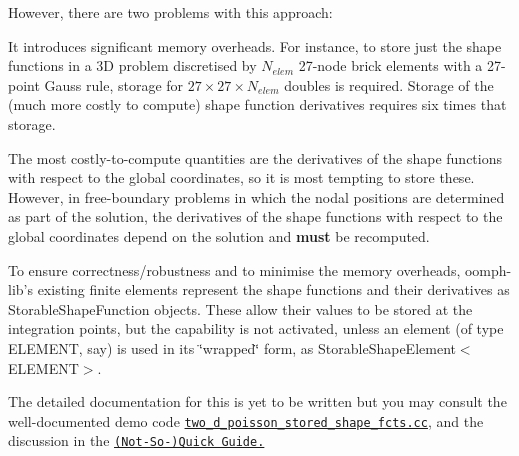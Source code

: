 However, there are two problems with this approach\-:
\begin{DoxyEnumerate}
\item It introduces significant memory overheads. For instance, to store just the shape functions in a 3\-D problem discretised by $ N_{elem}$ 27-\/node brick elements with a 27-\/point Gauss rule, storage for $ 27 \times 27 \times N_{elem} $ doubles is required. Storage of the (much more costly to compute) shape function derivatives requires six times that storage.
\item The most costly-\/to-\/compute quantities are the derivatives of the shape functions with respect to the global coordinates, so it is most tempting to store these. However, in free-\/boundary problems in which the nodal positions are determined as part of the solution, the derivatives of the shape functions with respect to the global coordinates depend on the solution and {\bfseries must} be recomputed.
\end{DoxyEnumerate}To ensure correctness/robustness and to minimise the memory overheads, {\ttfamily oomph-\/lib's} existing finite elements represent the shape functions and their derivatives as {\ttfamily Storable\-Shape\-Function} objects. These allow their values to be stored at the integration points, but the capability is not activated, unless an element (of type {\ttfamily E\-L\-E\-M\-E\-N\-T}, say) is used in its \char`\"{}wrapped\char`\"{} form, as {\ttfamily Storable\-Shape\-Element$<$\-E\-L\-E\-M\-E\-N\-T$>$}.

The detailed documentation for this is yet to be written but you may consult the well-\/documented demo code \href{../../../demo_drivers/optimisation/stored_shape_fcts/two_d_poisson_stored_shape_fcts.cc}{\tt two\-\_\-d\-\_\-poisson\-\_\-stored\-\_\-shape\-\_\-fcts.\-cc}, and the discussion in the \href{../../quick_guide/html/index.html#pre_compute_psi}{\tt (Not-\/\-So-\/)Quick Guide.}



 


